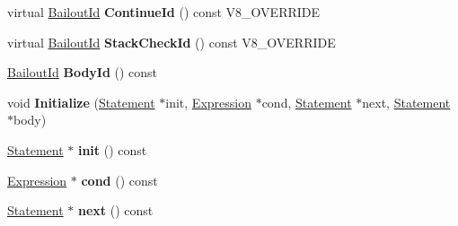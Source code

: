 \begin{DoxyCompactItemize}
\item 
\hypertarget{classv8_1_1internal_1_1_v8___f_i_n_a_l_a90b5e273e8b8f7894751af55a67b2be4}{}virtual \hyperlink{classv8_1_1internal_1_1_bailout_id}{Bailout\+Id} {\bfseries Continue\+Id} () const V8\+\_\+\+O\+V\+E\+R\+R\+I\+D\+E\label{classv8_1_1internal_1_1_v8___f_i_n_a_l_a90b5e273e8b8f7894751af55a67b2be4}

\item 
\hypertarget{classv8_1_1internal_1_1_v8___f_i_n_a_l_a990170f24ee26a29557d05605ccb92d8}{}virtual \hyperlink{classv8_1_1internal_1_1_bailout_id}{Bailout\+Id} {\bfseries Stack\+Check\+Id} () const V8\+\_\+\+O\+V\+E\+R\+R\+I\+D\+E\label{classv8_1_1internal_1_1_v8___f_i_n_a_l_a990170f24ee26a29557d05605ccb92d8}

\item 
\hypertarget{classv8_1_1internal_1_1_v8___f_i_n_a_l_a2fec0b05981577d54664b461a42deaac}{}\hyperlink{classv8_1_1internal_1_1_bailout_id}{Bailout\+Id} {\bfseries Body\+Id} () const \label{classv8_1_1internal_1_1_v8___f_i_n_a_l_a2fec0b05981577d54664b461a42deaac}

\item 
\hypertarget{classv8_1_1internal_1_1_v8___f_i_n_a_l_a331fb91b38696cbba95c51e78683cbd0}{}void {\bfseries Initialize} (\hyperlink{classv8_1_1internal_1_1_statement}{Statement} $\ast$init, \hyperlink{classv8_1_1internal_1_1_expression}{Expression} $\ast$cond, \hyperlink{classv8_1_1internal_1_1_statement}{Statement} $\ast$next, \hyperlink{classv8_1_1internal_1_1_statement}{Statement} $\ast$body)\label{classv8_1_1internal_1_1_v8___f_i_n_a_l_a331fb91b38696cbba95c51e78683cbd0}

\item 
\hypertarget{classv8_1_1internal_1_1_v8___f_i_n_a_l_ae4e68b7a0bad253c8337a61bd0c60d59}{}\hyperlink{classv8_1_1internal_1_1_statement}{Statement} $\ast$ {\bfseries init} () const \label{classv8_1_1internal_1_1_v8___f_i_n_a_l_ae4e68b7a0bad253c8337a61bd0c60d59}

\item 
\hypertarget{classv8_1_1internal_1_1_v8___f_i_n_a_l_a035f12c3b864b92f85a04c70f159ce73}{}\hyperlink{classv8_1_1internal_1_1_expression}{Expression} $\ast$ {\bfseries cond} () const \label{classv8_1_1internal_1_1_v8___f_i_n_a_l_a035f12c3b864b92f85a04c70f159ce73}

\item 
\hypertarget{classv8_1_1internal_1_1_v8___f_i_n_a_l_a9b06da86e6e0eebc6beb48588278c4be}{}\hyperlink{classv8_1_1internal_1_1_statement}{Statement} $\ast$ {\bfseries next} () const \label{classv8_1_1internal_1_1_v8___f_i_n_a_l_a9b06da86e6e0eebc6beb48588278c4be}


\end{DoxyCompactItemize}
